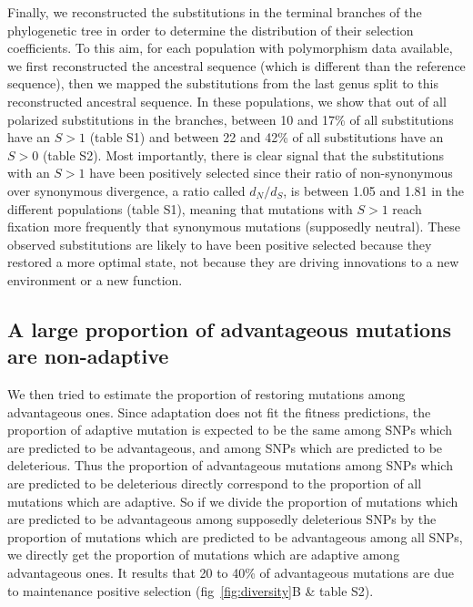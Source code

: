 \documentclass{article}
\newcommand{\dn}{d_N}
\newcommand{\ds}{d_S}
\newcommand{\dnds}{\dn / \ds}
\newcommand{\Sphy}{S}
\begin{document}
    Finally, we reconstructed the substitutions in the terminal branches of the phylogenetic tree in order to determine the distribution of their selection coefficients.
    To this aim, for each population with polymorphism data available, we first reconstructed the ancestral sequence (which is different than the reference sequence), then we mapped the substitutions from the last genus split to this reconstructed ancestral sequence.
    In these populations, we show that out of all polarized substitutions in the branches, between 10 and 17\% of all substitutions have an $\Sphy > 1$ (table S1) and between 22 and 42\% of all substitutions have an $\Sphy > 0$ (table S2).
    Most importantly, there is clear signal that the substitutions with an $\Sphy > 1$ have been positively selected since their ratio of non-synonymous over synonymous divergence, a ratio called $\dnds$, is between 1.05 and 1.81 in the different populations (table S1), meaning that mutations with $\Sphy > 1$ reach fixation more frequently that synonymous mutations (supposedly neutral).
    These observed substitutions are likely to have been positive selected because they restored a more optimal state, not because they are driving innovations to a new environment or a new function.

    \subsection*{A large proportion of advantageous mutations are non-adaptive}

    We then tried to estimate the proportion of restoring mutations among advantageous ones.
    Since adaptation does not fit the fitness predictions, the proportion of adaptive mutation is expected to be the same among SNPs which are predicted to be advantageous, and among SNPs which are predicted to be deleterious.
    Thus the proportion of advantageous mutations among SNPs which are predicted to be deleterious directly correspond to the proportion of all mutations which are adaptive.
    So if we divide the proportion of mutations which are predicted to be advantageous among supposedly deleterious SNPs by the proportion of mutations which are predicted to be advantageous among all SNPs, we directly get the proportion of mutations which are adaptive among advantageous ones.
    It results that 20 to 40\% of advantageous mutations are due to maintenance positive selection (fig~\ref{fig:diversity}B \& table S2).
\end{document}
